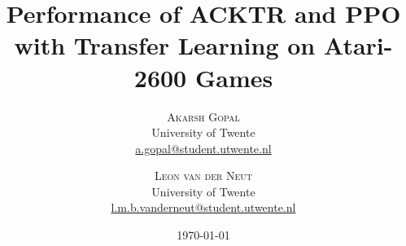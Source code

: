 \usepackage{titling} %

\usepackage{hyperref} %


\setlength{\droptitle}{-4\baselineskip} %

\pretitle{\begin{center}\Huge\bfseries} %
\posttitle{\end{center}} %
\title{Performance of ACKTR and PPO with Transfer Learning on Atari-2600 Games} %
\author{%
\textsc{Akarsh Gopal}\\[1ex] %
\normalsize University of Twente \\ %
\normalsize \href{mailto:a.gopal@student.utwente.nl}{a.gopal@student.utwente.nl} %
\and %
\textsc{Leon van der Neut}\\[1ex] %
\normalsize University of Twente \\ %
\normalsize \href{mailto:l.m.b.vanderneut@student.utwente.nl }{l.m.b.vanderneut@student.utwente.nl } %
}
\date{\today} %
\renewcommand{\maketitlehookd}{%
\begin{abstract}
\noindent In this paper, empirical research is conducted on the effects of Transfer Learning on the performance of two state-of-the-art Reinforcement Learning algorithms in a diverse set of tasks. This is carried out using open-source high-quality implementations of the algorithms presented by OpenAI in Baselines (OpenAIa, 2018). This research intends to develop insights into the effects Transfer Learning bears on the performance of these algorithms and the methodology of research that could be followed to conduct studies which hold significance. The results show positive effects of Transfer Learning on particular source and target task combinations, while also showing negative effects on other combinations. In general, the results show that it is not straightforward to predict when transfer learning will prove beneficial for Reinforcement Learning. 
\end{abstract}
}

